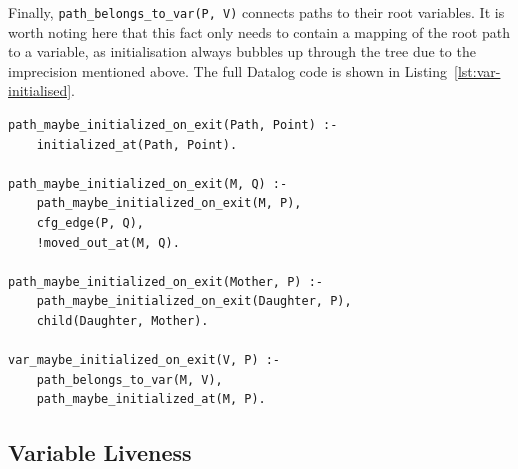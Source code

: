 \documentclass[11pt,a4paper,twoside,openany]{report}
\newenvironment{sourcecode}{\captionsetup{type=listing}}{}
\newcommand{\InDatalog}[1]{\texttt{#1}}
\begin{document}
Finally, \InDatalog{path_belongs_to_var(P, V)} connects paths to their root
variables. It is worth noting here that this fact only needs to contain a
mapping of the root path to a variable, as initialisation always bubbles up
through the tree due to the imprecision mentioned above. The full Datalog code
is shown in Listing~\ref{lst:var-initialised}.

\begin{sourcecode}
  \label{lst:var-initialised}
\begin{verbatim}
path_maybe_initialized_on_exit(Path, Point) :- 
    initialized_at(Path, Point).

path_maybe_initialized_on_exit(M, Q) :-
    path_maybe_initialized_on_exit(M, P),
    cfg_edge(P, Q),
    !moved_out_at(M, Q).

path_maybe_initialized_on_exit(Mother, P) :-
    path_maybe_initialized_on_exit(Daughter, P),
    child(Daughter, Mother).

var_maybe_initialized_on_exit(V, P) :-
    path_belongs_to_var(M, V),
    path_maybe_initialized_at(M, P).
\end{verbatim}
\end{sourcecode}

\subsection{Variable Liveness}
\label{sec:var-livenes}
\end{document}
